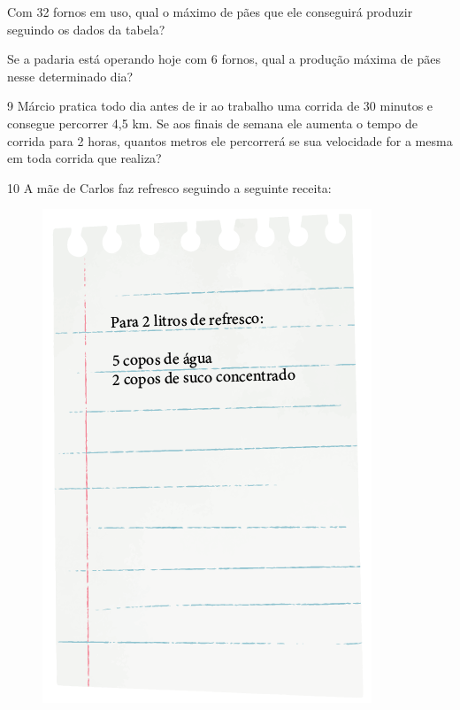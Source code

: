 \begin{escolha}
\item
  Com 32 fornos em uso, qual o máximo de pães que ele conseguirá
  produzir seguindo os dados da tabela?\\

\item
  Se a padaria está operando hoje com 6 fornos, qual a produção máxima
  de pães nesse determinado dia?\\
\end{escolha}

\num{9} Márcio pratica todo dia antes de ir ao trabalho uma corrida de 30
minutos e consegue percorrer 4,5 km. Se aos finais de semana ele aumenta o
tempo de corrida para 2 horas, quantos metros ele percorrerá se sua
velocidade for a mesma em toda corrida que realiza?\enlargethispage{2\baselineskip}

\begin{emptybox}
\end{emptybox}

\pagebreak
\num{10} A mãe de Carlos faz refresco seguindo a seguinte receita:

\begin{figure}[htpb!]
\centering
\includegraphics[width=.5\textwidth]{../ilustracoes/MAT5/SAEB_5ANO_MAT_figura79.png}
\end{figure}

